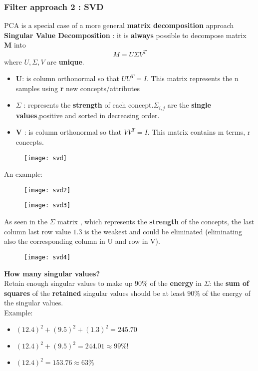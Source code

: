 \subsubsection{Filter approach 2 : SVD}
PCA is a special case of a more general \textbf{matrix decomposition} approach \textbf{Singular Value Decomposition} : it is \textbf{always} possible to decompose matrix \textbf{M} into $$ M= U \Sigma V^T$$
 where $U,\Sigma,V$ are \textbf{unique}.
 \begin{itemize}
 \item \textbf{U}:  is column orthonormal so that $UU^T = I$. This matrix represents the n samples using \textbf{r} new concepts/attributes
 \item $\Sigma$ : represents the \textbf{strength}  of each concept.$\Sigma_{i,j}$ are the \textbf{single values},positive and sorted in decreasing order.
 \item \textbf{V} : is column orthonormal so that $VV^T=I$. This matrix contains m terms, r concepts.
\end{itemize}  
\begin{figure}[H]
  \centering
  \texttt{[image: svd]}
\end{figure}
An example:
\begin{figure}[H]
  \centering
  \texttt{[image: svd2]}
\end{figure}
\begin{figure}[H]
  \centering
  \texttt{[image: svd3]}
\end{figure}
As seen in the $\Sigma$ matrix , which represents the \textbf{strength} of the concepts, the last column last row value $1.3$ is the weakest and could be eliminated (eliminating also the corresponding column in U and row in V).
\begin{figure}[H]
  \centering
  \texttt{[image: svd4]}
\end{figure}
\textbf{How many singular values?}\\
Retain enough singular values to make up $90\%$ of the \textbf{energy} in $\Sigma$:
the \textbf{sum of squares} of the \textbf{retained} singular values should be at least $90\%$ of the energy of the singular values.\\
Example:
\begin{itemize}
\item $(12.4)^2 + (9.5)^2 + (1.3)^2 = 245.70$
\item $(12.4)^2 + (9.5)^2 = 244.01 \approx 99\%!$
\item $(12.4)^2 = 153.76 \approx 63\%$
\end{itemize}

